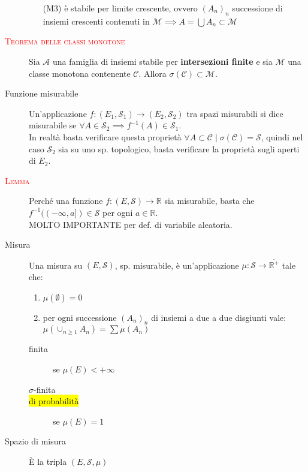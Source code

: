 \documentclass[a4paper,10pt]{article}
\newcommand{\myth}{\normalfont \scshape \textcolor{red}} %
\theoremstyle{remark}
\theoremstyle{definition}
\begin{document}
\begin{description}
\begin{itemize}
        \item[(M3)] è stabile per limite crescente, ovvero $(A_n)_n$ successione di insiemi crescenti  contenuti in $\mathcal{M} \implies A=\bigcup A_n \subset \mathcal{M}$
    \end{itemize}
    \item[\myth{Teorema delle classi monotone}] Sia $\mathcal{A}$ una famiglia di insiemi stabile per \textbf{intersezioni finite} e sia $\mathcal{M}$ una classe monotona contenente $\mathcal{C}$. Allora $\sigma (\mathcal{C})\subset \mathcal{M}$.
    \item[Funzione misurabile] Un'applicazione $f: (E_1, \mathcal{S}_1) \to (E_2, \mathcal{S}_2)$ tra spazi misurabili si dice misurabile se  $\forall A \in \mathcal{S}_2  \implies f^{-1}(A) \in \mathcal{S}_1$. \\
    In realtà basta verificare questa proprietà $\forall A \subset \mathcal{C} \mid \sigma (\mathcal{C})= \mathcal{S}$, quindi nel caso $\mathcal{S}_2$ sia su uno sp. topologico, basta verificare la proprietà sugli aperti di $E_2$.

    \item[\myth{Lemma}] Perché una funzione $f: (E, \mathcal{S}) \to \mathbb{R}$ sia misurabile, basta che $f^{-1}((-\infty,a])\in\mathcal{S}$ per ogni $a\in\mathbb{R}$. \\
    MOLTO IMPORTANTE per def. di variabile aleatoria.

    \item[Misura] Una misura su $(E, \mathcal{S})$, sp. misurabile, è un'applicazione $\mu : \mathcal{S} \to \overline{\mathbb{R}^+}$ tale che:
    \begin{enumerate}
        \item $\mu (\emptyset)=0$
        \item per ogni successione  $(A_n)_n$ di insiemi a due a due disgiunti vale: $\mu (\cup_{n\ge 1} A_n)=\sum\mu(A_n)$
   \end{enumerate}
   \begin{description}
       \item[finita] se  $\mu  (E) < +\infty$ 
       \item[$\sigma$-finita]
       \item[\hl{di probabilità}] se  $\mu  (E)=1$
   \end{description}
   \item[Spazio di misura] È la tripla $(E, \mathcal{S}, \mu)$ 
    
\end{description}
\end{document}
